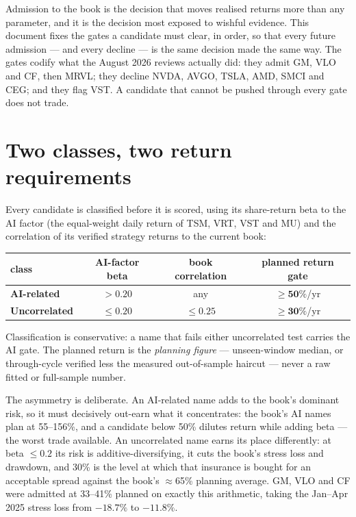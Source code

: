 \documentclass[11pt,a4paper]{article}
\newcommand{\tabnote}[1]{\begin{center}\begin{minipage}{0.92\textwidth}
  \footnotesize\color{bcgrey}#1\end{minipage}\end{center}}
\begin{document}
Admission to the book is the decision that moves realised returns more than any
parameter, and it is the decision most exposed to wishful evidence. This document
fixes the gates a candidate must clear, in order, so that every future admission
--- and every decline --- is the same decision made the same way. The gates codify
what the August 2026 reviews actually did: they admit GM, VLO and CF, then MRVL;
they decline NVDA, AVGO, TSLA, AMD, SMCI and CEG; and they flag VST. A candidate that cannot be pushed through
every gate does not trade.

\section{Two classes, two return requirements}

Every candidate is classified before it is scored, using its share-return beta to
the AI factor (the equal-weight daily return of TSM, VRT, VST and MU) and the
correlation of its verified strategy returns to the current book:

\begin{center}
\begin{tabular}{lccc}
\toprule
class & AI-factor beta & book correlation & \textbf{planned return gate} \\
\midrule
\textbf{AI-related}   & $> 0.20$   & any        & $\boldsymbol{\geq 50\%}$/yr \\
\textbf{Uncorrelated} & $\leq 0.20$ & $\leq 0.25$ & $\boldsymbol{\geq 30\%}$/yr \\
\bottomrule
\end{tabular}
\end{center}

\tabnote{Classification is conservative: a name that fails either uncorrelated
test carries the AI gate. The planned return is the \emph{planning figure} ---
unseen-window median, or through-cycle verified less the measured out-of-sample
haircut --- never a raw fitted or full-sample number.}

The asymmetry is deliberate. An AI-related name adds to the book's dominant risk,
so it must decisively out-earn what it concentrates: the book's AI names plan at
55--156\%, and a candidate below 50\% dilutes return while adding beta --- the
worst trade available. An uncorrelated name earns its place differently: at beta
$\leq 0.2$ its risk is additive-diversifying, it cuts the book's stress loss and
drawdown, and 30\% is the level at which that insurance is bought for an
acceptable spread against the book's $\approx$65\% planning average. GM, VLO and
CF were admitted at 33--41\% planned on exactly this arithmetic, taking the
Jan--Apr 2025 stress loss from $-18.7\%$ to $-11.8\%$.
\end{document}
